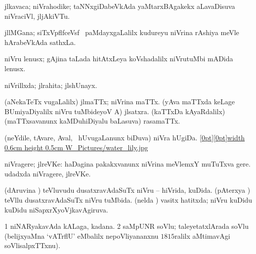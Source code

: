 {\bentry
{} 
\gl{\nA}
\expl{}
\bmng
{} 
\emng
\eentry

\bentry
{} 
\gl{\nA}
\expl{}
\bmng
jlkavaca; niVrahodike; taNNxgiDabeVkAda yaMtarxBAgakekx aLavaDisuva niVraciVl, jljAkiVTu. 
\emng
\eentry

\bentry
{} 
\gl{\nA}
\expl{}
\bmng
jllMGana; siTxVpflfceVsf \mo\ paMdayxgaLalilx kudureyu niVrina rAshiya meVle hArabeVkAda sathxLa. 
\emng
\eentry

\bentry
{} 
\gl{\nA}
\expl{}
\bmng
niVru lenusx; gAjina taLada hitAtxLeya koVshadalilx niVrutuMbi mADida lenusx. 
\emng
\eentry

\bentry
{} 
\gl{\gu}
\expl{}
\bmng
niVrillxda; jlrahita; jlshUnayx. 
\emng
\eentry

\bentry
{} 
\gl{\nA}
\expl{}
\bmng
\banum
{} (aNekaTeTx \mo vugaLalilx) jlmaTTx; niVrina maTTx. 
 (yAva maTTxda keLage BUmiyaDiyalilx niVru tuMbideyoV A) jlsatxra. 
 (kaTTxDa kAyaRdalilx) (maTTxsavanunx kaMDuhiDiyalu baLasuva) rasamaTTx. 
\eanum
\emng
\eentry

\bentry
{} 
\gl{\nA}
\expl{}
\bmng
(neYdile, tAvare, Aval, \mo\ hUvugaLanunx biDuva) niVra hUgiDa. \quad \hyperlink{water_lilyfigure}{\raisebox{-0.15cm}[0pt][0pt]{\pdfimage width 0.6cm height 0.5cm {W_Pictures/water_lily.jpg}}} 
\emng
\eentry

\bentry
{} 
\gl{\nA}
\expl{}
\bmng
niVragere; jlreVKe: 
\banum
{} haDagina pakakxvanunx niVrina meVlemxY muTuTxva gere. 
 udadxda niVragere, jlreVKe. 
\eanum
\emng
\eentry

\bentry
{} 
\gl{\gu}
\expl{}
\bmng
\banum
{} (dAruvina \vi) teVluvudu dusatxravAdaSuTx niVru -- hiVrida, kuDida. 
 (pAterxya \vi) teVllu dusatxravAdaSuTx niVru tuMbida. 
 (nelda \vi) vasitx hatitxda; niVru kuDidu kuDidu niSapxrXyoVjkavAgiruva. 
\eanum
\emng
\eentry

\bentry
{} 
\gl{\nA}
\expl{}
\bmng
\bnum
\num{1} niNARyakavAda kALaga, kadana. 
\num{2} saMpUNR soVlu; taleyetatxlArada soVlu (belijxyaMna `vATrflU' eMbalilx nepoVliyananxnu $1815$ralilx aMtimavAgi soVlisalpxTTxnu). 
\enum
\emng
\eentry

}
